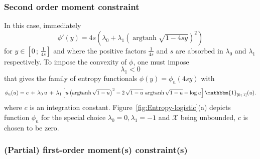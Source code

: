 \documentclass[english,sort&compress]{elsarticle}
\theoremstyle{definition}
\theoremstyle{plain}
\theoremstyle{plain}
\def\X{\mathcal{X}}
\def\un{\mathbbm{1}}
\def\argtanh{\operatorname{argtanh}}
\begin{document}

\subsubsection{Second order moment constraint}

In this case, immediately 
%
\[
\phi'(y)  =  4  s  \left(  \lambda_0  +  \lambda_1  \left(  \argtanh\sqrt{1-4sy}
  \right)^2 \right)
\]
%
for $y \in \left[ 0 \, ; \, \frac{1}{4s} \right]$ and where the positive factors
$\frac{1}{4   s}$  and  $s$   are  absorbed   in  $\lambda_0$   and  $\lambda_1$
respectively.  To impose the convexity of $\phi$, one must impose
%
\[
\lambda_1 < 0
\]
%
that gives  the family of  entropy functionals $\phi(y) =  \phi_{\mathrm{u}}(4 s
y)$ with
%
\[
\phi_{\mathrm{u}}(u) = c \,  + \,  \lambda_0 \, u  \, +  \, \lambda_1  \left[ u
  \left( \argtanh\sqrt{1-u} \right)^2 -  2 \, \sqrt{1-u} \, \argtanh\sqrt{1-u} -
  \log u \right] \un_{\left[ 0 \, ; \, 1 \right]}(u).
\]
%
where  $c$  is  an integration  constant.   Figure~\ref{fig:Entropy-logistic}(a)
depicts  function $\phi_{\mathrm{u}}$  for the  special choice  $\lambda_0 =  0,
\lambda_1 = -1$ and $\X$ being unbounded, $c$ is chosen to be zero.



\subsubsection{(Partial) first-order moment(s) constraint(s)}
\end{document}
